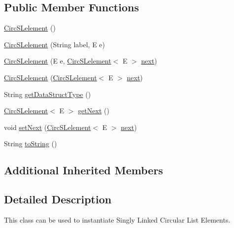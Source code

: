 \subsection*{Public Member Functions}
\begin{DoxyCompactItemize}
\item 
\hyperlink{classbridges_1_1base_1_1_circ_s_lelement_a4a5a58cc7a0ec5170a828861c11df1b3}{Circ\+S\+Lelement} ()
\item 
\hyperlink{classbridges_1_1base_1_1_circ_s_lelement_a213d61713e51295d756669def911f080}{Circ\+S\+Lelement} (String label, E e)
\item 
\hyperlink{classbridges_1_1base_1_1_circ_s_lelement_ada65c593c8af7e6ed96fcdf12c26824f}{Circ\+S\+Lelement} (E e, \hyperlink{classbridges_1_1base_1_1_circ_s_lelement}{Circ\+S\+Lelement}$<$ E $>$ \hyperlink{classbridges_1_1base_1_1_s_lelement_abf61c96a74ad319d561c6952ea388e0e}{next})
\item 
\hyperlink{classbridges_1_1base_1_1_circ_s_lelement_ab9e5b98e8d917760b9651a52785358b9}{Circ\+S\+Lelement} (\hyperlink{classbridges_1_1base_1_1_circ_s_lelement}{Circ\+S\+Lelement}$<$ E $>$ \hyperlink{classbridges_1_1base_1_1_s_lelement_abf61c96a74ad319d561c6952ea388e0e}{next})
\item 
String \hyperlink{classbridges_1_1base_1_1_circ_s_lelement_ad56acddc52e8e0b6869a6f24f1e0a90e}{get\+Data\+Struct\+Type} ()
\item 
\hyperlink{classbridges_1_1base_1_1_circ_s_lelement}{Circ\+S\+Lelement}$<$ E $>$ \hyperlink{classbridges_1_1base_1_1_circ_s_lelement_ae18b07e3f1d37b5eca0cae22efc0d395}{get\+Next} ()
\item 
void \hyperlink{classbridges_1_1base_1_1_circ_s_lelement_acb8e78195e80a243d0add9a5d281f01c}{set\+Next} (\hyperlink{classbridges_1_1base_1_1_circ_s_lelement}{Circ\+S\+Lelement}$<$ E $>$ \hyperlink{classbridges_1_1base_1_1_s_lelement_abf61c96a74ad319d561c6952ea388e0e}{next})
\item 
String \hyperlink{classbridges_1_1base_1_1_circ_s_lelement_af307188926766e73efb988f102ce9740}{to\+String} ()
\end{DoxyCompactItemize}
\subsection*{Additional Inherited Members}


\subsection{Detailed Description}
This class can be used to instantiate Singly Linked Circular List Elements. 

